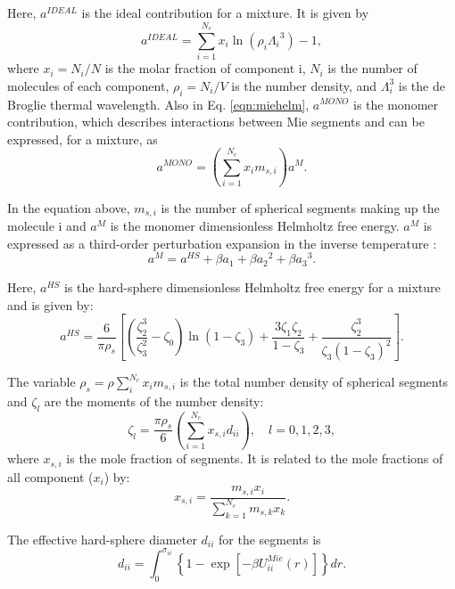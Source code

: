 Here, $a^{IDEAL}$ is the ideal contribution for a mixture. It is given by
\begin{equation}
a^{IDEAL} = \sum_{i=1}^{N_{c}} x_{i}\ln{(\rho_{i}{\Lambda_{i}}^3)} -1 ,
\label{eqn:aideal}
\end{equation}
where $x_{i}=N_{i}/N$ is the molar fraction of component i, $N_{i}$ is the number of molecules of each component, $\rho_{i}=N_{i}/V$ is the number density, and $\Lambda_{i}^3$ is the de Broglie thermal wavelength. Also in Eq. \ref{eqn:miehelm}, $a^{MONO}$ is the monomer contribution, which  describes interactions between Mie segments and can be expressed, for a mixture, as
\begin{equation}
a^{MONO} = \left(\sum_{i=1}^{N_{c}} x_{i}m_{s,i} \right)a^{M} .
\label{eqn:amonomer}
\end{equation}

In the equation above, $m_{s,i}$ is the number of spherical segments making up the molecule i and $a^{M}$  is the monomer dimensionless Helmholtz free energy. $a^{M}$ is expressed as a third-order perturbation expansion in the inverse temperature \cite{bh1976}:
\begin{equation}
a^{M} = a^{HS}+\beta{a_{1}}+\beta{a_{2}}^2+\beta{a_{3}}^3 . 
\label{eqn:aM}
\end{equation}

Here, $a^{HS}$ is the hard-sphere dimensionless Helmholtz free energy for a mixture and is given by:
\begin{equation}
a^{HS} = \frac{6}{\pi\rho_{s}}\left[\left(\frac{\zeta^3_2}{\zeta^2_3}-\zeta_0 \right)\ln(1-\zeta_3)+\frac{3\zeta_{1}\zeta_{2}}{1-\zeta_3}+ \frac{\zeta^3_2}{\zeta_{3}(1-\zeta_3)^2}\right] .
\label{eqn:hs}
\end{equation}

The variable $\rho_{s}=\rho\sum_{i}^{N_c} x_{i}m_{s,i}$ is the total number density of spherical segments and $\zeta_l$ are the moments of the number density:
\begin{equation}
\zeta_l = \frac{\pi\rho_s}{6}\left(\sum_{i=1}^{N_c} x_{s,i}d_{ii} \right), \quad l = 0,1,2,3 ,
\label{eqn:zetal}
\end{equation}
where $x_{s,i}$ is the mole fraction of segments. It is related to the mole fractions of all component ($x_i$) by:
\begin{equation}
x_{s,i} = \frac{m_{s,i}x_i}{\sum_{k=1}^{N_c} m_{s,k}x_{k} } .
\label{eqn:xsi}
\end{equation}


The effective hard-sphere diameter $d_{ii}$ for the segments is
\begin{equation}
d_{ii} =\int_{0}^{\sigma_{ii}} \left \lbrace 1 - \exp \left [-\beta U^{Mie}_{ii}(r) \right ] \right \rbrace dr .
\label{eqn:diameter}
\end{equation}


